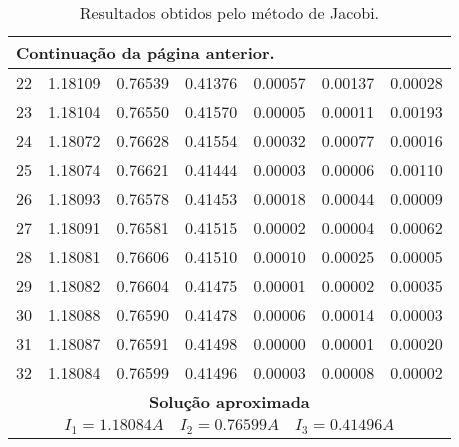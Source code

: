 \documentclass[a4paper,11pt, twoside]{article}
\newcommand{\n}[1]{\textbf{#1}}
\begin{document}
    {\linespread{1}
    \begin{table}[!th]
        \begin{center}
            \begin{tabular}{ c c c c c c c }
                \midrule
                \multicolumn{7}{l}{{\small Continuação da página anterior.}}\\
                \midrule
                22 & 1.18109 & 0.76539 & 0.41376 & 0.00057  & 0.00137  & 0.00028 \\
                \midrule
                23 & 1.18104 & 0.76550 & 0.41570 & 0.00005  & 0.00011  & 0.00193 \\
                \midrule
                24 & 1.18072 & 0.76628 & 0.41554 & 0.00032  & 0.00077  & 0.00016 \\
                \midrule
                25 & 1.18074 & 0.76621 & 0.41444 & 0.00003  & 0.00006  & 0.00110 \\
                \midrule
                26 & 1.18093 & 0.76578 & 0.41453 & 0.00018  & 0.00044  & 0.00009 \\
                \midrule
                27 & 1.18091 & 0.76581 & 0.41515 & 0.00002  & 0.00004  & 0.00062 \\
                \midrule
                28 & 1.18081 & 0.76606 & 0.41510 & 0.00010  & 0.00025  & 0.00005 \\
                \midrule
                29 & 1.18082 & 0.76604 & 0.41475 & 0.00001  & 0.00002  & 0.00035 \\
                \midrule
                30 & 1.18088 & 0.76590 & 0.41478 & 0.00006  & 0.00014  & 0.00003 \\
                \midrule
                31 & 1.18087 & 0.76591 & 0.41498 & 0.00000  & 0.00001  & 0.00020 \\
                \midrule
                32 & 1.18084 & 0.76599 & 0.41496 & 0.00003  & 0.00008  & 0.00002 \\
                \toprule[0.11em]
                \multicolumn{7}{c}{\n{Solução aproximada}}\\
                \toprule[0.11em]
                \multicolumn{7}{c}{$I_1 = 1.18084A\quad I_2 = 0.76599A\quad I_3 = 0.41496A$}\\
                \midrule
            \end{tabular}
        \end{center}
        \caption{Resultados obtidos pelo método de Jacobi.}\label{tab}
    \end{table}}
    
\end{document}
